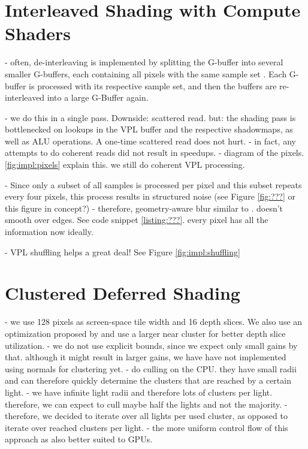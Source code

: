 
\section{Interleaved Shading with Compute Shaders}
\label{sec:impl:interleavedShading}
- often, de-interleaving is implemented by splitting the G-buffer into several smaller G-buffers, each containing all pixels with the same sample set \cite{segovia2006non}. Each G-buffer is processed with its respective sample set, and then the buffers are re-interleaved into a large G-Buffer again.


- we do this in a single pass. Downside: scattered read. but: the shading pass is bottlenecked on lookups in the VPL buffer and the respective shadowmaps, as well as ALU operations. A one-time scattered read does not hurt.
- in fact, any attempts to do coherent reads did not result in speedups.
- diagram of the pixels. \ref{fig:impl:pixels} explain this. we still do coherent VPL processing.

- Since only a subset of all samples is processed per pixel and this subset repeats every four pixels, this process results in structured noise (see Figure \ref{fig:???} or this figure in concept?)
- therefore, geometry-aware blur similar to \citet{laine2007incremental}. doesn't smooth over edges. See code snippet \ref{listing:???}. every pixel has all the information now ideally.

- VPL shuffling helps a great deal! See Figure \ref{fig:impl:shuffling}

\section{Clustered Deferred Shading}
\label{sec:impl:clusteredShading}

- we use 128 pixels as screen-space tile width and 16 depth slices. We also use an optimization proposed by \citet{???practical} and use a larger near cluster for better depth slice utilization.
- we do not use explicit bounds, since we expect only small gains by that. although it might result in larger gains, we have have not implemented using normals for clustering yet.
- \citet{???practical} do culling on the CPU. they have small radii and can therefore quickly determine the clusters that are reached by a certain light.
- we have infinite light radii and therefore lots of clusters per light. therefore, we can expect to cull maybe half the lights and not the majority.
- therefore, we decided to iterate over all lights per used cluster, as opposed to iterate over reached clusters per light.
- the more uniform control flow of this approach as also better suited to GPUs.

